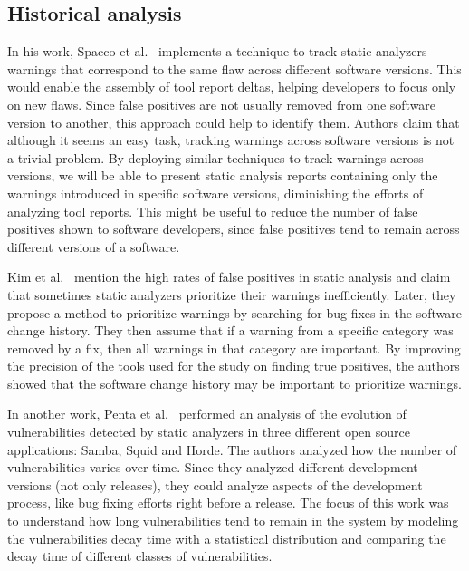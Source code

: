 \subsection{Historical analysis}
\label{history_review}

In his work, Spacco et al.~\cite{spacco_tracking_2006} implements a technique
to track static analyzers warnings that correspond to the same flaw across
different software versions. This would enable the assembly of tool report
deltas, helping developers to focus only on new flaws. Since false positives
are not usually removed from one software version to another, this approach
could help to identify them. Authors claim that although it seems an easy task,
tracking warnings across software versions is not a trivial problem. By
deploying similar techniques to track warnings across versions, we will be able
to present static analysis reports containing only the warnings introduced in
specific software versions, diminishing the efforts of analyzing tool reports.
This might be useful to reduce the number of false positives shown to software
developers, since false positives tend to remain across different versions of a
software.

Kim et al.~\cite{kim_which_2007} mention the high rates of false positives in
static analysis and claim that sometimes static analyzers prioritize their
warnings inefficiently. Later, they propose a method to prioritize
warnings by searching for bug fixes in the software change history. They then
assume that if a warning from a specific category was removed by a fix, then
all warnings in that category are important. By improving the precision of the
tools used for the study on finding true positives, the authors showed that the
software change history may be important to prioritize warnings.

In another work, Penta et al.~\cite{penta_evolution_2008} performed an analysis
of the evolution of vulnerabilities detected by static analyzers in three
different open source applications: Samba, Squid and Horde. The authors
analyzed how the number of vulnerabilities varies over time. Since they
analyzed different development versions (not only releases), they could analyze
aspects of the development process, like bug fixing efforts right before a
release. The focus of this work was to understand how long vulnerabilities tend
to remain in the system by modeling the vulnerabilities decay time with a
statistical distribution and comparing the decay time of different classes of
vulnerabilities.


